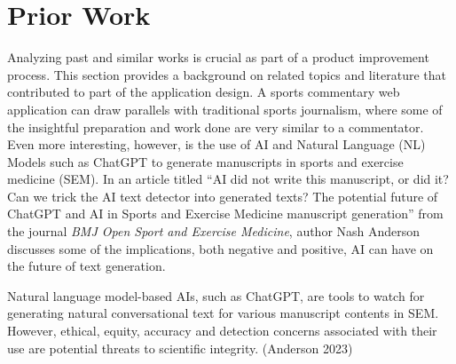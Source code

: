 \documentclass[10pt,twocolumn]{article}
\begin{document}
\section{Prior Work}

Analyzing past and similar works is crucial as part of a product improvement process. This section provides a background on related topics and literature that contributed to part of the application design. \break\break
\indent A sports commentary web application can draw parallels with traditional sports journalism, where some of the insightful preparation and work done are very similar to a commentator. Even more interesting, however, is the use of AI and Natural Language (NL) Models such as ChatGPT to generate manuscripts in sports and exercise medicine (SEM). In an article titled “AI did not write this manuscript, or did it? Can we trick the AI text detector into generated texts? The potential future of ChatGPT and AI in Sports and Exercise Medicine manuscript generation” from the journal \textit{BMJ Open Sport and Exercise Medicine}, author Nash Anderson discusses some of the implications, both negative and positive, AI can have on the future of text generation. 

\begin{displayquote}
Natural language model-based AIs, such as ChatGPT, are tools to watch for generating natural conversational text for various manuscript contents in SEM. However, ethical, equity, accuracy and detection concerns associated with their use are potential threats to scientific integrity. (Anderson 2023)
\end{displayquote}
\cite{nash2023}
\end{document}
